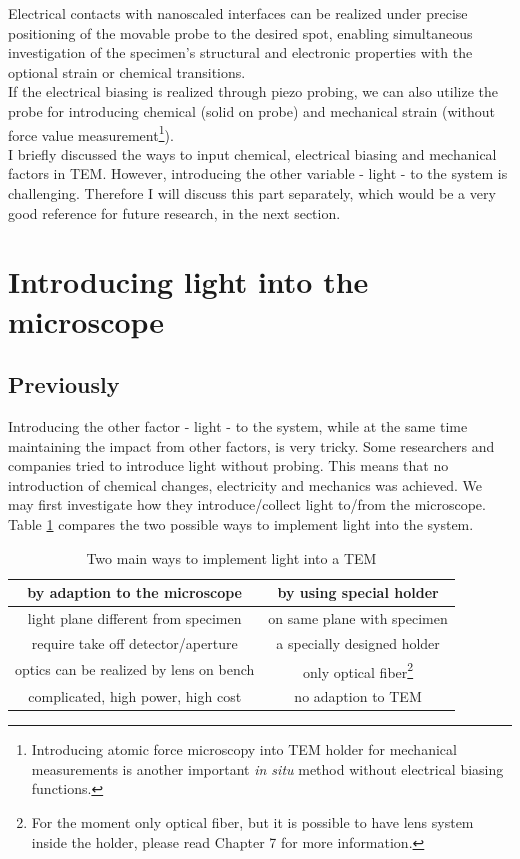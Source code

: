 Electrical contacts with nanoscaled interfaces can be realized under precise positioning of the movable probe to the desired spot, enabling simultaneous investigation of the specimen’s structural and electronic  properties with the optional strain or chemical transitions.\\

If the electrical biasing is realized through piezo probing, we can also utilize the probe for introducing chemical (solid on probe) and mechanical strain (without force value measurement\footnote{Introducing atomic force microscopy into TEM holder for mechanical measurements is another important {\em in situ} method without electrical biasing functions.}). \\

I briefly discussed the ways to input chemical, electrical biasing and mechanical factors in TEM. However, introducing  the other variable - light - to the system is challenging. Therefore I will discuss this part separately, which would be a very good reference for future research, in the next section. 

\section{Introducing light into the microscope}
\subsection{Previously}
Introducing the other factor - light - to the system, while at the same time maintaining the impact from other factors, is very tricky. Some researchers and companies tried to introduce light without probing. This means that no introduction of chemical changes, electricity and mechanics was achieved. We may first investigate how they introduce/collect light to/from the microscope. 
Table \ref{table2.1} compares the two possible ways to implement light into the system. 

\begin{table}[ht]
\centering 
\begin{tabular}{|c|c|} 
\hline 
by adaption to the microscope & by using special holder \\ [0.5ex] 
\hline 
light plane different from specimen & on same plane with specimen \\[1.5ex] 
require take off detector/aperture & a specially designed holder \\[1.5ex]
optics can be realized by lens on bench & only optical fiber\footnote{For the moment only optical fiber, but it is possible to have lens system inside the holder, please read Chapter 7 for more information.} \\[1.5ex]
complicated, high power, high cost & no adaption to TEM\\[1.5ex]
\hline
\end{tabular}
\caption{Two main ways to implement light into a TEM} 
\label{table2.1} 
\end{table}

